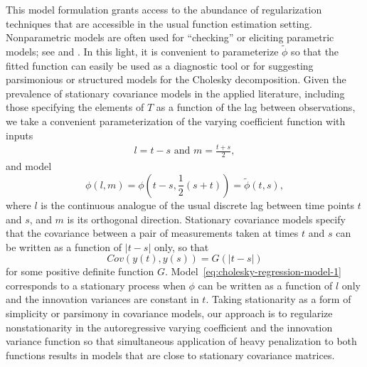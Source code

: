 This model formulation grants access to the abundance of regularization techniques that are accessible in the usual function estimation setting. Nonparametric models are often used for ``checking'' or eliciting parametric models; see \cite{cox1988testing} and \cite{liu2004hypothesis}. In this light, it is convenient to parameterize $\tilde{\phi}$ so that the fitted function can easily be used as a diagnostic tool or for suggesting parsimonious or structured models for the Cholesky decomposition. Given the prevalence of stationary covariance models in the applied literature, including those specifying the elements of $T$ as a function of the lag between observations, we take a convenient parameterization of the varying coefficient function with inputs
\begin{align}\label{eq:l-m-transformation}
l = t - s \mbox{ and } m = \frac{t + s}{2}, 
\end{align}
\noindent
and model 
\begin{equation} \label{eq:phi-to-tilde-phi} 
\phi\left(l,m\right) = {\phi}\left(t-s, \frac{1}{2}\left(s+t\right)\right) = \tilde{\phi}\left(t,s\right),
\end{equation}
\noindent
where $l$ is the continuous analogue of the usual discrete lag between time points $t$ and $s$, and $m$ is its orthogonal direction. Stationary covariance models specify that the covariance between a pair of measurements taken at times $t$ and $s$ can be written as a function of $\vert t - s\vert $ only, so that
\begin{equation*}
Cov\left(y\left( t \right),y\left( s \right)\right) = G\left( \vert t - s\vert  \right)
\end{equation*}
\noindent
for some positive definite function $G$. Model~\eqref{eq:cholesky-regression-model-1} corresponds to a stationary process when $\phi$ can be written as a function of $l$ only and the innovation variances are constant in $t$. Taking stationarity as a form of simplicity or parsimony in covariance models, our approach is to regularize nonstationarity in the autoregressive varying coefficient and the innovation variance function so that simultaneous application of heavy penalization to both functions results in models that are close to stationary covariance matrices.%


